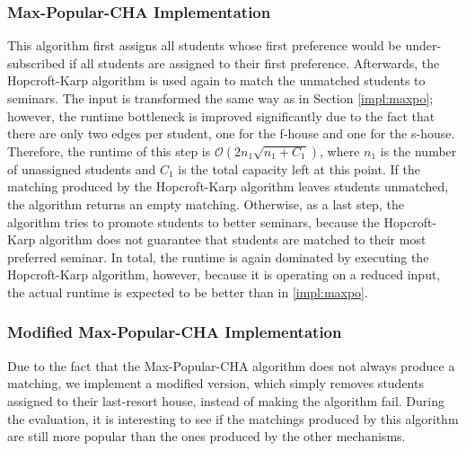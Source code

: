 \subsubsection{Max-Popular-CHA Implementation}
This algorithm first assigns all students whose first preference would be under-subscribed if all students are assigned to their first preference. Afterwards, the Hopcroft-Karp algorithm is used again to match the unmatched students to seminars. The input is transformed the same way as in Section \ref{impl:maxpo}; however, the runtime bottleneck is improved significantly due to the fact that there are only two edges per student, one for the f-house and one for the s-house. Therefore, the runtime of this step is $\mathcal{O}(2n_1\sqrt{n_1+C_1})$, where $n_1$ is the number of unassigned students and $C_1$ is the total capacity left at this point. If the matching produced by the Hopcroft-Karp algorithm leaves students unmatched, the algorithm returns an empty matching. Otherwise, as a last step, the algorithm tries to promote students to better seminars, because the Hopcroft-Karp algorithm does not guarantee that students are matched to their most preferred seminar. In total, the runtime is again dominated by executing the Hopcroft-Karp algorithm, however, because it is operating on a reduced input, the actual runtime is expected to be better than in \ref{impl:maxpo}.

\subsubsection{Modified Max-Popular-CHA Implementation}\label{impl:mod-max-pop}
Due to the fact that the Max-Popular-CHA algorithm does not always produce a matching, we implement a modified version, which simply removes students assigned to their last-resort house, instead of making the algorithm fail. During the evaluation, it is interesting to see if the matchings produced by this algorithm are still more popular than the ones produced by the other mechanisms.

